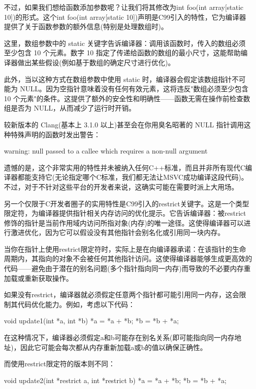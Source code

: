 不过，如果我们想给函数添加参数呢？让我们将其修改为int foo(int array[static 10])的形式。这个int foo(int array[static 10])声明是C99引入的特性，它为编译器提供了关于函数参数的额外信息(特别是处理数组时)。

这里，数组参数中的 static 关键字告诉编译器：调用该函数时，传入的数组必须至少包含 10 个元素。数字 10 指定了传递给函数的数组的最小尺寸，这能帮助编译器做出某些假设(例如基于数组的确定尺寸进行优化)。

此外，当以这种方式在数组参数中使用 static 时，编译器会假定该数组指针不可能为 NULL。因为空指针意味着没有任何有效元素，这将违反"数组必须至少包含 10 个元素"的条件。这提供了额外的安全性和明确性——函数无需在操作前检查数组是否为 NULL，从而减少了运行时开销。

较新版本的 Clang(基本上 3.1.0 以上)甚至会在你用臭名昭著的 NULL 指针调用这种特殊声明的函数时发出警告：

\begin{shell}
warning: null passed to a callee which requires a non-null argument
\end{shell}

遗憾的是，这个非常实用的特性并未被纳入任何C++标准，而且并非所有现代C编译器都能支持它(无论指定哪个C标准，我们都无法让MSVC成功编译这段代码)。不过，对于不针对这些平台的开发者来说，这确实可能在需要时派上大用场。

另一个仅限于C开发者圈子的实用特性是C99引入的restrict关键字。这是一个类型限定符，为编译器提供指针相关内存访问的优化提示。它告诉编译器：被restrict修饰的指针是当前作用域内访问所指对象(内存)的唯一途径。这使得编译器可以进行激进优化，因为它可以假设没有其他指针会别名化或引用同一块内存。

当你在指针上使用restrict限定符时，实际上是在向编译器承诺：在该指针的生命周期内，其指向的对象不会被任何其他指针访问。这使得编译器能够生成更高效的代码——避免由于潜在的别名问题(多个指针指向同一内存)而导致的不必要内存重加载或重新获取操作。

如果没有restrict，编译器就必须假定任意两个指针都可能引用同一内存，这会限制其代码优化能力。例如，考虑以下代码：

\begin{cpp}
void update1(int *a, int *b) {
  *a = *a + *b;
  *b = *b + *a;
}
\end{cpp}

在这种情况下，编译器必须假定a和b可能存在别名关系(即可能指向同一内存地址)，因此它可能会每次都从内存重新加载a或b的值以确保正确性。

而使用restrict限定符的版本则不同：

\begin{cpp}
void update2(int *restrict a, int *restrict b) {
  *a = *a + *b;
  *b = *b + *a;
}
\end{cpp}

